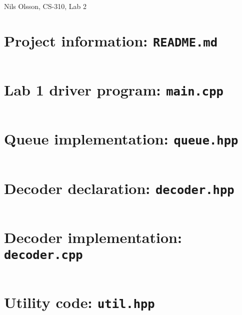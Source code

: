 \documentclass{article}
\begin{document}
\begin{center}
    Nils Olsson, CS-310, Lab 2
\end{center}
\hrulefill{}

\section*{Project information: \texttt{README.md}}
\inputminted{md}{README.md}

\section*{Lab 1 driver program: \texttt{main.cpp}}
\inputminted{cpp}{src/main.cpp}

\section*{Queue implementation: \texttt{queue.hpp}}
\inputminted{cpp}{src/queue.hpp}

\section*{Decoder declaration: \texttt{decoder.hpp}}
\inputminted{cpp}{src/decoder.hpp}

\section*{Decoder implementation: \texttt{decoder.cpp}}
\inputminted{cpp}{src/decoder.cpp}

\section*{Utility code: \texttt{util.hpp}}
\inputminted{cpp}{src/util.hpp}
\end{document}
